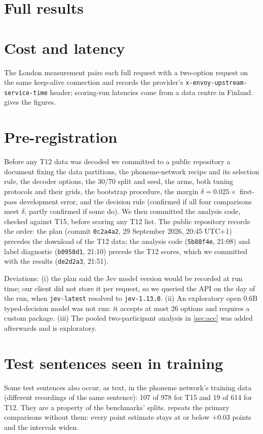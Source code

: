 \section{Full results}
\label{app:full}



\section{Cost and latency}
\label{app:latency}

The London measurement pairs each full request with a two-option request on the same keep-alive
connection and records the provider's \texttt{x-envoy-upstream-service-time} header; scoring-run
latencies come from a data centre in Finland.  gives the figures.

\section{Pre-registration}
\label{app:prereg}

Before any T12 data was decoded we committed to a public repository a document fixing the data
partitions, the phoneme-network recipe and its selection rule, the decoder options, the 30/70 split
and seed, the arms, both tuning protocols and their grids, the bootstrap procedure, the margin
$\delta = 0.025 \times$ first-pass development error, and the decision rule (confirmed if all four
comparisons meet $\delta$, partly confirmed if some do). We then committed the analysis code,
checked against T15, before scoring any T12 list. The public repository records the order: the plan
(commit \texttt{0c2a4a2}, 29 September 2026, 20:45 UTC+1) precedes the download of the T12 data; the
analysis code (\texttt{5b88f4e}, 21:08) and label diagnostic (\texttt{b0958d1}, 21:10) precede the
T12 scores, which we committed with the results (\texttt{de2d2a3}, 21:51).

Deviations: (i) the plan said the Jev model version would be recorded at run time; our client did
not store it per request, so we queried the API on the day of the run, when \texttt{jev-latest}
resolved to \texttt{jev-1.13.0}. (ii) An exploratory open 0.6B typed-decision model was not run: it
accepts at most 26 options and requires a custom package. (iii) The pooled two-participant analysis
in \cref{sec:acc} was added afterwards and is exploratory.

\section{Test sentences seen in training}
\label{app:overlap}

Some test sentences also occur, as text, in the phoneme network's training data (different
recordings of the same sentence): 107 of 978 for T15 and 19 of 614 for T12. They are a property of
the benchmarks' splits.  repeats the primary comparisons without them: every point
estimate stays at or below $+0.03$ points and the intervals widen.
